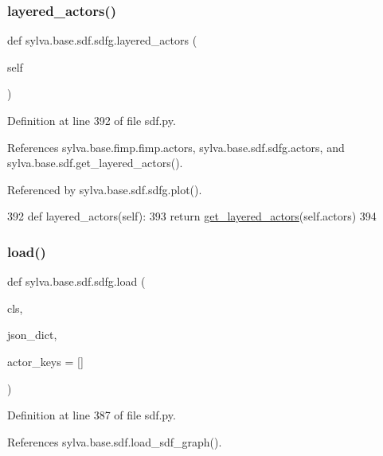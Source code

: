\subsubsection{\texorpdfstring{layered\+\_\+actors()}{layered\_actors()}}
{\footnotesize\ttfamily def sylva.\+base.\+sdf.\+sdfg.\+layered\+\_\+actors (\begin{DoxyParamCaption}\item[{}]{self }\end{DoxyParamCaption})}



Definition at line 392 of file sdf.\+py.



References sylva.\+base.\+fimp.\+fimp.\+actors, sylva.\+base.\+sdf.\+sdfg.\+actors, and sylva.\+base.\+sdf.\+get\+\_\+layered\+\_\+actors().



Referenced by sylva.\+base.\+sdf.\+sdfg.\+plot().


\begin{DoxyCode}
392         \textcolor{keyword}{def }layered\_actors(self):
393             \textcolor{keywordflow}{return} \hyperlink{namespacesylva_1_1base_1_1sdf_a1e0fb379d9b6a1f2adb650611bdb49e6}{get\_layered\_actors}(self.actors)
394 
\end{DoxyCode}
\mbox{\label{classsylva_1_1base_1_1sdf_1_1sdfg_abdac55d55690dc28e8cbd5dcaf05493c}} 
\subsubsection{\texorpdfstring{load()}{load()}}
{\footnotesize\ttfamily def sylva.\+base.\+sdf.\+sdfg.\+load (\begin{DoxyParamCaption}\item[{}]{cls,  }\item[{}]{json\+\_\+dict,  }\item[{}]{actor\+\_\+keys = {\ttfamily \mbox{[}\mbox{]}} }\end{DoxyParamCaption})}



Definition at line 387 of file sdf.\+py.



References sylva.\+base.\+sdf.\+load\+\_\+sdf\+\_\+graph().



